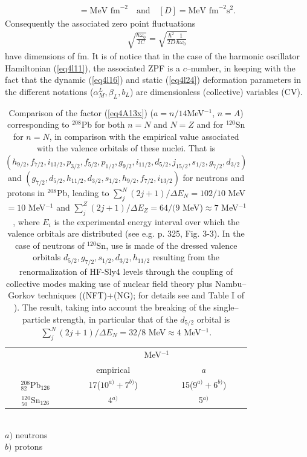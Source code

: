 \begin{subappendices}
\begin{align*}
[C]=\text{MeV fm}^{-2}\quad\text{and}\quad [D]=\text{MeV fm}^{-2}\text{s}^2.
\end{align*}
Consequently the associated zero point fluctuations
\begin{align}\label{eq4A18}
\sqrt{\frac{\hbar\omega_0}{2C}}=\sqrt{\frac{\hbar^2}{2D}\frac{1}{\hbar\omega_0}}
\end{align}
have dimensions of fm. It is of notice that in the case of the harmonic oscillator Hamiltonian (\ref{eq4l11}), the associated ZPF is a $c$--number, in keeping with the fact that the dynamic (\ref{eq4l16}) and static (\ref{eq4l24}) deformation parameters in the different notations ($\alpha^L_M,\beta_L,b_L$) are  dimensionless (collective) variables (CV). 
    \begin{table}
    \centering
    \begin{tabular}{|c|c|c|}
\hline
&\multicolumn{2}{c|}{MeV$^{-1}$}\\
\cline{2-3}
&empirical& $a$\\
\hline
$^{208}_{82}$Pb$_{126}$& 17($10^{a)}+7^{b)}$)& 15($9^{a)}+6^{b)}$)\\
\hline
$^{120}_{50}$Sn$_{126}$& 4$^{a)}$& 5$^{a)}$\\
\hline
    \end{tabular}\\$a)$ neutrons\\$b)$ protons\\\caption{
    Comparison of the factor (\ref{eq4A13x}) ($a=n/14$MeV$^{-1}$, $n=A$) corresponding to $^{208}$Pb for both $n=N$ and $N=Z$ and for $^{120}$Sn for $n=N$, in comparison with the empirical value associated with the valence orbitals of these nuclei. That is $(h_{9/2},f_{7/2},i_{13/2},p_{3/2},f_{5/2},p_{1/2},g_{9/2},i_{11/2},d_{5/2},j_{15/2},s_{1/2},g_{7/2},d_{3/2})$ and $(g_{7/2},d_{5/2},h_{11/2},d_{3/2},s_{1/2},h_{9/2},f_{7/2},i_{13/2})$ for neutrons and protons in $^{208}$Pb, leading to $\sum_j^N(2j+1)/\Delta E_N=102/10$ MeV$=10$ MeV$^{-1}$ and $\sum_j^Z(2j+1)/\Delta E_Z=64/(9$ MeV)$\approx7$ MeV$^{-1}$, where $E_i$ is the experimental energy interval over which the valence orbitals are distributed (see e.g. \cite{Bohr:69} p. 325, Fig. 3-3). In the case of neutrons of $^{120}$Sn, use is made of the dressed valence orbitals $d_{5/2},g_{7/2},s_{1/2},d_{3/2},h_{11/2}$ resulting from the renormalization of HF-Sly4 levels through the coupling of collective modes making use of nuclear field theory plus Nambu--Gorkov techniques ((NFT)+(NG); for details see \cite{Idini:15} and Table I of \cite{Potel:17}). The result, taking into account the breaking of the single--particle strength, in particular that of the $d_{5/2}$ orbital is $\sum_j^N(2j+1)/\Delta E_N=32/8$ MeV$\approx4$ MeV$^{-1}$.}\label{tab4A1}
    \end{table}

\end{subappendices}
